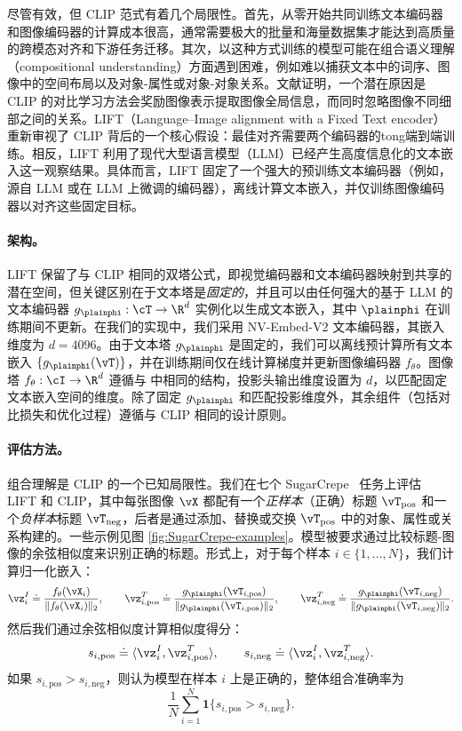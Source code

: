 \documentclass[../../book-main_zh.tex]{subfiles}
\begin{document}
尽管有效，但 CLIP 范式有着几个局限性。首先，从零开始共同训练文本编码器和图像编码器的计算成本很高，通常需要极大的批量和海量数据集才能达到高质量的跨模态对齐和下游任务迁移。其次，以这种方式训练的模型可能在组合语义理解（compositional understanding）方面遇到困难，例如难以捕获文本中的词序、图像中的空间布局以及对象-属性或对象-对象关系。文献证明，一个潜在原因是 CLIP 的对比学习方法会奖励图像表示提取图像全局信息，而同时忽略图像不同细部之间的关系。LIFT（Language–Image alignment with a Fixed Text encoder）~\citep{yang2025languageimagealignmentfixedtext} 重新审视了 CLIP 背后的一个核心假设：最佳对齐需要两个编码器的tong端到端训练。相反，LIFT 利用了现代大型语言模型（LLM）已经产生高度信息化的文本嵌入这一观察结果。具体而言，LIFT 固定了一个强大的预训练文本编码器（例如，源自 LLM 或在 LLM 上微调的编码器），离线计算文本嵌入，并仅训练图像编码器以对齐这些固定目标。

\paragraph{架构。}
LIFT 保留了与 CLIP 相同的双塔公式，即视觉编码器和文本编码器映射到共享的潜在空间，但关键区别在于文本塔是\emph{固定的}，并且可以由任何强大的基于 LLM 的文本编码器 \(g_{\plainphi}:\cT\to\R^{d}\) 实例化以生成文本嵌入，其中 \(\plainphi\) 在训练期间不更新。在我们的实现中，我们采用 NV-Embed-V2 文本编码器，其嵌入维度为 \(d=4096\)。由于文本塔 \(g_{\plainphi}\) 是固定的，我们可以离线预计算所有文本嵌入 \(\{g_{\plainphi}(\vT)\}\)，并在训练期间仅在线计算梯度并更新图像编码器 \(f_{\theta}\)。图像塔 \(f_{\theta}:\cI\to\R^{d}\) 遵循与  中相同的结构，投影头输出维度设置为 \(d\)，以匹配固定文本嵌入空间的维度。除了固定 \(g_{\plainphi}\) 和匹配投影维度外，其余组件（包括对比损失和优化过程）遵循与 CLIP 相同的设计原则。

\paragraph{评估方法。} 
组合理解是 CLIP 的一个已知局限性。我们在七个 SugarCrepe~\citep{hsieh2023sugarcrepe} 任务上评估 LIFT 和 CLIP，其中每张图像 \(\vX\) 都配有一个\emph{正样本}（正确）标题 \(\vT_{\text{pos}}\) 和一个\emph{负样本}标题 \(\vT_{\text{neg}}\)，后者是通过添加、替换或交换 \(\vT_{\text{pos}}\) 中的对象、属性或关系构建的。一些示例见图 \ref{fig:SugarCrepe-examples}。模型被要求通过比较标题-图像的余弦相似度来识别正确的标题。形式上，对于每个样本 \(i\in\{1,\dots,N\}\)，我们计算归一化嵌入：
\[
\vz_i^{I} \doteq \frac{f_{\theta}(\vX_i)}{\|f_{\theta}(\vX_i)\|_2},\qquad
\vz_{i,\text{pos}}^{T} \doteq \frac{g_{\plainphi}(\vT_{i,\text{pos}})}{\|g_{\plainphi}(\vT_{i,\text{pos}})\|_2},\qquad
\vz_{i,\text{neg}}^{T} \doteq \frac{g_{\plainphi}(\vT_{i,\text{neg}})}{\|g_{\plainphi}(\vT_{i,\text{neg}})\|_2}.
\]
然后我们通过余弦相似度计算相似度得分：
\[
s_{i,\text{pos}} \doteq \langle \vz_i^{I}, \vz_{i,\text{pos}}^{T} \rangle,
\qquad
s_{i,\text{neg}} \doteq \langle \vz_i^{I}, \vz_{i,\text{neg}}^{T} \rangle.
\]
如果 \(s_{i,\text{pos}} > s_{i,\text{neg}}\)，则认为模型在样本 \(i\) 上是正确的，整体组合准确率为
\[
\frac{1}{N}\sum_{i=1}^{N}\boldsymbol{1}\{s_{i,\text{pos}} > s_{i,\text{neg}}\}.
\]
\end{document}
